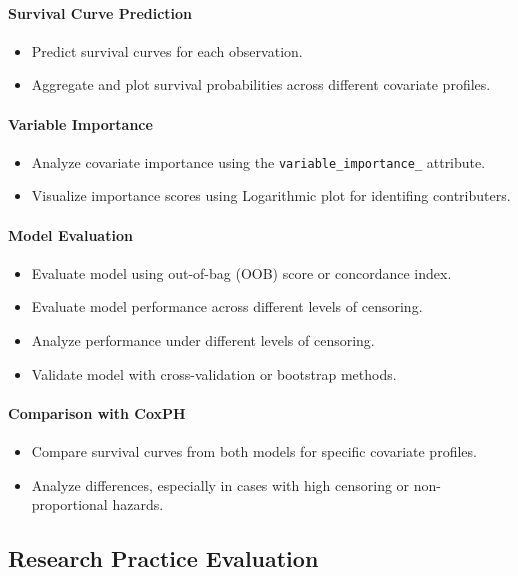 \paragraph*{Survival Curve Prediction}
\begin{itemize}
    \item Predict survival curves for each observation.
    \item Aggregate and plot survival probabilities across different covariate profiles.
\end{itemize}

\paragraph*{Variable Importance}
\begin{itemize}
    \item Analyze covariate importance using the \texttt{variable\_importance\_} attribute.
    \item Visualize importance scores using Logarithmic plot for identifing contributers.
\end{itemize}

\paragraph*{Model Evaluation}
\begin{itemize}
    \item Evaluate model using out-of-bag (OOB) score or concordance index.
    \item Evaluate model performance across different levels of censoring.
    \item Analyze performance under different levels of censoring.
    \item Validate model with cross-validation or bootstrap methods.
\end{itemize}

\paragraph*{Comparison with CoxPH}
\begin{itemize}
    \item Compare survival curves from both models for specific covariate profiles.
    \item Analyze differences, especially in cases with high censoring or non-proportional hazards.
\end{itemize}

\subsection{Research Practice Evaluation}

